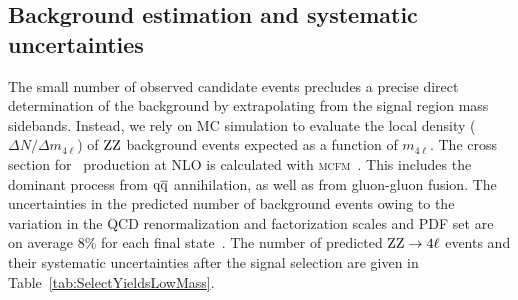 \documentclass[11pt,twoside,a4paper,cmspaper,final,collab]{cms-tdr}
\begin{document}
\subsection{Background estimation and systematic uncertainties}


The small number of observed candidate events precludes a precise direct determination of the background
by extrapolating from the signal region mass sidebands.
Instead, we rely on MC simulation to evaluate the local density ($\Delta N /  \Delta m_{4\ell}$) of $\mathrm{Z}\mathrm{Z}$ background
events  expected as a function of  $m_{4\ell}$.
The cross section
for \cPZ\cPZ\ production at NLO is calculated with
\textsc{mcfm}~\cite{MCFM,Campbell:1999ah,Campbell:2011bn}.
This includes the dominant process from $\mathrm{q}\mathrm{\overline{q}}$ annihilation,  as well as from gluon-gluon fusion.
The uncertainties in the predicted number of background events owing to the variation in the QCD renormalization and factorization
scales and PDF set
are on average 8\% for each final state~\cite{Dittmaier:2012vm}.
The number of predicted $\mathrm{Z}\mathrm{Z}\rightarrow 4\ell$  events and their systematic uncertainties after the signal
selection are given in Table~\ref{tab:SelectYieldsLowMass}.
\end{document}

